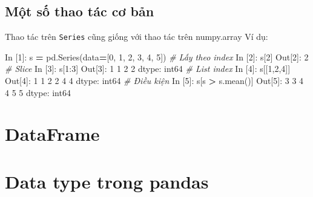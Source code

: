 \documentclass[
]{book}
\newenvironment{Shaded}{\begin{snugshade}}{\end{snugshade}}
\newcommand{\CommentTok}[1]{\textcolor[rgb]{0.56,0.35,0.01}{\textit{#1}}}
\newcommand{\DecValTok}[1]{\textcolor[rgb]{0.00,0.00,0.81}{#1}}
\newcommand{\NormalTok}[1]{#1}
\newcommand{\OperatorTok}[1]{\textcolor[rgb]{0.81,0.36,0.00}{\textbf{#1}}}
\begin{document}
\hypertarget{mux1ed9t-sux1ed1-thao-tuxe1c-cux1a1-bux1ea3n}{%
\subsection{Một số thao tác cơ bản}\label{mux1ed9t-sux1ed1-thao-tuxe1c-cux1a1-bux1ea3n}}

Thao tác trên \texttt{Series} cũng giống với thao tác trên numpy.array
Ví dụ:

\begin{Shaded}
\begin{Highlighting}[]
\NormalTok{In [}\DecValTok{1}\NormalTok{]: s }\OperatorTok{=}\NormalTok{ pd.Series(data}\OperatorTok{=}\NormalTok{[}\DecValTok{0}\NormalTok{, }\DecValTok{1}\NormalTok{, }\DecValTok{2}\NormalTok{, }\DecValTok{3}\NormalTok{, }\DecValTok{4}\NormalTok{, }\DecValTok{5}\NormalTok{])}
\CommentTok{\# Lấy theo index}
\NormalTok{In [}\DecValTok{2}\NormalTok{]: s[}\DecValTok{2}\NormalTok{]}
\NormalTok{Out[}\DecValTok{2}\NormalTok{]: }\DecValTok{2}
\CommentTok{\# Slice }
\NormalTok{In [}\DecValTok{3}\NormalTok{]: s[}\DecValTok{1}\NormalTok{:}\DecValTok{3}\NormalTok{]}
\NormalTok{Out[}\DecValTok{3}\NormalTok{]:}
\DecValTok{1}    \DecValTok{1}
\DecValTok{2}    \DecValTok{2}
\NormalTok{dtype: int64}
\CommentTok{\# List index}
\NormalTok{In [}\DecValTok{4}\NormalTok{]: s[[}\DecValTok{1}\NormalTok{,}\DecValTok{2}\NormalTok{,}\DecValTok{4}\NormalTok{]]}
\NormalTok{Out[}\DecValTok{4}\NormalTok{]:}
\DecValTok{1}    \DecValTok{1}
\DecValTok{2}    \DecValTok{2}
\DecValTok{4}    \DecValTok{4}
\NormalTok{dtype: int64}
\CommentTok{\# Điều kiện}
\NormalTok{In [}\DecValTok{5}\NormalTok{]: s[s }\OperatorTok{\textgreater{}}\NormalTok{ s.mean()]}
\NormalTok{Out[}\DecValTok{5}\NormalTok{]:}
\DecValTok{3}    \DecValTok{3}
\DecValTok{4}    \DecValTok{4}
\DecValTok{5}    \DecValTok{5}
\NormalTok{dtype: int64}
\end{Highlighting}
\end{Shaded}

\hypertarget{dataframe}{%
\section{DataFrame}\label{dataframe}}

\hypertarget{data-type-trong-pandas}{%
\section{Data type trong pandas}\label{data-type-trong-pandas}}
\end{document}
